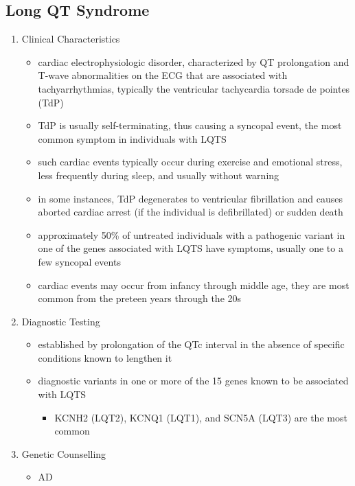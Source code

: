 \documentclass[12pt]{scrartcl}
\begin{document}
\subsection{Long QT Syndrome}
\label{sec:org57d7962}
\begin{enumerate}
\item Clinical Characteristics
\label{sec:org110d791}
\begin{itemize}
\item cardiac electrophysiologic disorder, characterized by QT
prolongation and T-wave abnormalities on the ECG that are associated
with tachyarrhythmias, typically the ventricular tachycardia torsade
de pointes (TdP)
\item TdP is usually self-terminating, thus causing a syncopal event, the
most common symptom in individuals with LQTS
\item such cardiac events typically occur during exercise and emotional
stress, less frequently during sleep, and usually without warning
\item in some instances, TdP degenerates to ventricular fibrillation and
causes aborted cardiac arrest (if the individual is defibrillated)
or sudden death
\item approximately 50\% of untreated individuals with a pathogenic variant
in one of the genes associated with LQTS have symptoms, usually one
to a few syncopal events
\item cardiac events may occur from infancy through middle age, they are
most common from the preteen years through the 20s
\end{itemize}
\item Diagnostic Testing
\label{sec:orgdaeedea}
\begin{itemize}
\item established by prolongation of the QTc interval in the absence of
specific conditions known to lengthen it
\item diagnostic variants in one or more of the 15 genes known to be
associated with LQTS
\begin{itemize}
\item KCNH2 (LQT2), KCNQ1 (LQT1), and SCN5A (LQT3) are the most common
\end{itemize}
\end{itemize}
\item Genetic Counselling
\label{sec:orgbbda77b}
\begin{itemize}
\item AD
\end{itemize}
\end{enumerate}
\end{document}
